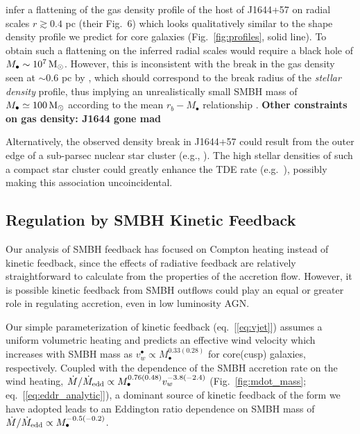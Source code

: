 \documentclass[usenatbib,fleqn]{mn2e}
\newcommand{\Mbh}[1][]{M_{\bullet#1}}
\begin{document}
\citet{BergerZauderer+:2012a} infer a flattening of the gas density
profile of the host of J1644+57 on radial scales $r \gtrsim 0.4$ pc
(their Fig.~6) which looks qualitatively similar to the shape density
profile we predict for core galaxies (Fig.~\ref{fig:profiles}, solid
line).  To obtain such a flattening on the inferred radial scales
would require a black hole of $\Mbh\sim 10^7 \Msun$.  However, this is
inconsistent with the break in the gas density seen at $\sim 0.6$ pc
by \citet{BergerZauderer+:2012a}, which should correspond to the break
radius of the {\it stellar density} profile, thus implying an
unrealistically small SMBH mass of $\Mbh\simeq 100\Msun$ according to
the mean $r_b-M_{\bullet}$ relationship
\citep{LauerFaber+:2007a}. {\bf Other constraints on gas density:
  J1644 gone mad}

Alternatively, the observed density break in J1644+57 could result
from the outer edge of a sub-parsec nuclear star cluster (e.g.,
\citealt{Carson+15}).  The high stellar densities of such a compact
star cluster could greatly enhance the TDE rate
(e.g.~\citealt{Stone&Metzger15}), possibly making this association
uncoincidental.


\subsection{Regulation by SMBH Kinetic Feedback}
\label{sec:kinetic}

Our analysis of SMBH feedback has focused on Compton heating
instead of kinetic feedback, since the effects of radiative feedback
are relatively straightforward to calculate from the properties of the
accretion flow.  However, it is possible kinetic feedback from SMBH outflows could play an equal or greater role in regulating accretion, even in low luminosity AGN.

Our simple parameterization of kinetic feedback (eq.~[\ref{eq:vjet}]) assumes a uniform volumetric heating and predicts an
effective wind velocity which increases with SMBH mass as
$v_{w}^{\bullet} \propto M_{\bullet}^{0.33(0.28)}$ for core(cusp)
galaxies, respectively.  Coupled with the dependence of the SMBH
accretion rate on the wind heating, $\dot{M}/\dot{M}_{\rm edd} \propto
M_{\bullet}^{0.76(0.48)}v_{w}^{-3.8(-2.4)}$ (Fig.~\ref{fig:mdot_mass};
eq.~[\ref{eq:eddr_analytic}]), a dominant source of kinetic feedback of the form we have
adopted leads to an Eddington ratio dependence on SMBH mass of
$\dot{M}/\dot{M}_{\rm edd} \propto M_{\bullet}^{-0.5(-0.2)}$.
\end{document}
